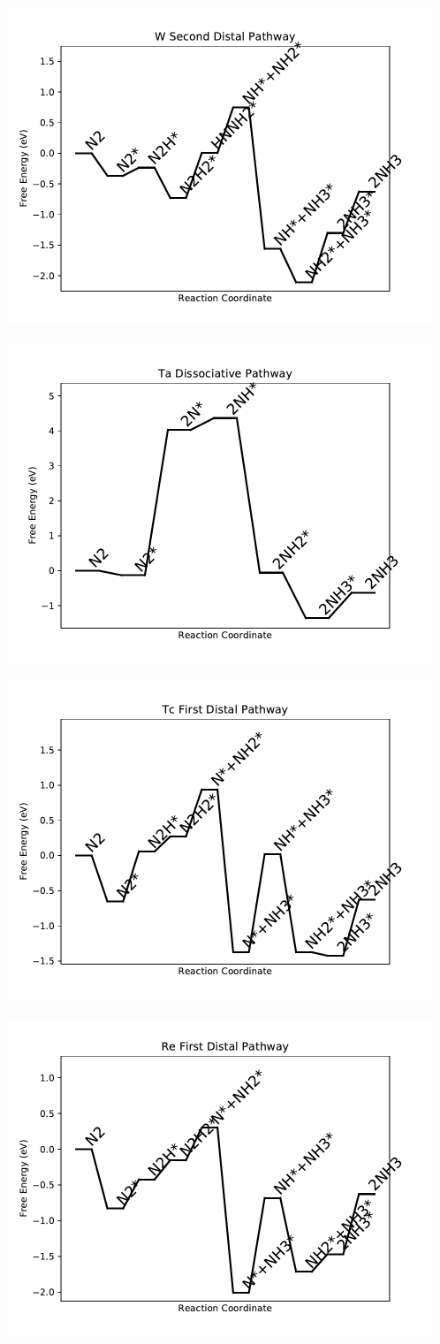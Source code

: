 \documentclass[journal=jacsat,manuscript=article]{achemso}
\begin{document}
\begin{figure}
\includegraphics[width=0.5\linewidth]{data/plots/W_distal_2.pdf}
\label{fig:W_distal_2}
\end{figure}

\newpage
\begin{figure}
\includegraphics[width=0.5\linewidth]{data/plots/Ta_dissociative.pdf}
\label{fig:Ta_dissociative}
\end{figure}

\begin{figure}
\includegraphics[width=0.5\linewidth]{data/plots/Tc_distal_1.pdf}
\label{fig:Tc_distal_1}
\end{figure}

\newpage
\begin{figure}
\includegraphics[width=0.5\linewidth]{data/plots/Re_distal_1.pdf}
\label{fig:Re_distal_1}
\end{figure}
\end{document}
